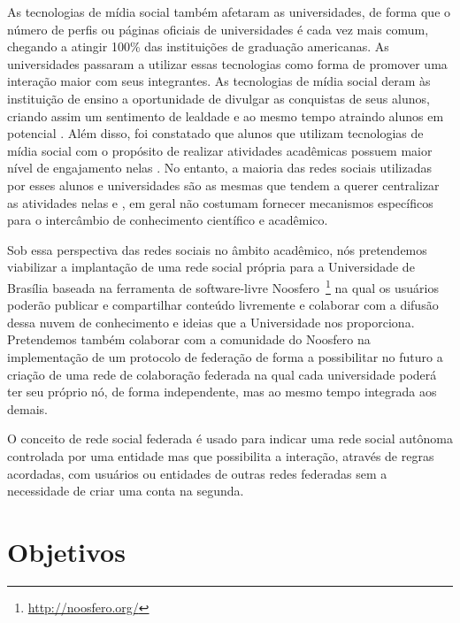 As tecnologias de mídia social também afetaram as universidades, de forma que o
número de perfis ou páginas oficiais de universidades é cada vez mais comum,
chegando a atingir 100\% das instituições de graduação americanas. As
universidades passaram a utilizar essas tecnologias como forma de promover uma
interação maior com seus integrantes. As tecnologias de mídia social deram às
instituição de ensino a oportunidade de divulgar as conquistas de seus alunos,
criando assim um sentimento de lealdade e ao mesmo tempo atraindo alunos em
potencial \cite{solis2008}. 
%
Além disso, foi constatado que alunos que utilizam tecnologias de mídia social
com o propósito de realizar atividades acadêmicas possuem maior nível de
engajamento nelas  \cite{ccsse2009}. No entanto, a maioria das redes sociais
utilizadas por esses alunos e universidades são as mesmas que tendem a querer
centralizar as atividades nelas e , em geral não 	costumam fornecer mecanismos
específicos para o intercâmbio de conhecimento científico e acadêmico.


Sob essa perspectiva das redes sociais no âmbito acadêmico, nós pretendemos
viabilizar a implantação de uma rede social própria para a Universidade de
Brasília baseada na ferramenta de software-livre 
Noosfero~\footnote{\url{http://noosfero.org/}}
na qual os usuários poderão publicar e compartilhar conteúdo livremente e
colaborar com a difusão dessa nuvem de conhecimento e ideias que a Universidade
nos proporciona.
%
Pretendemos também colaborar com a comunidade do Noosfero na implementação de um
protocolo de federação de forma a possibilitar no futuro a criação de uma rede
de colaboração federada na qual cada universidade poderá ter seu próprio nó, de
forma independente, mas ao mesmo tempo integrada aos demais.

O conceito de rede social federada é usado para indicar uma rede social autônoma
controlada por uma entidade mas que possibilita a interação, através de regras
acordadas, com usuários ou entidades de outras redes federadas sem a necessidade
de criar uma conta na segunda.


\section{Objetivos}

